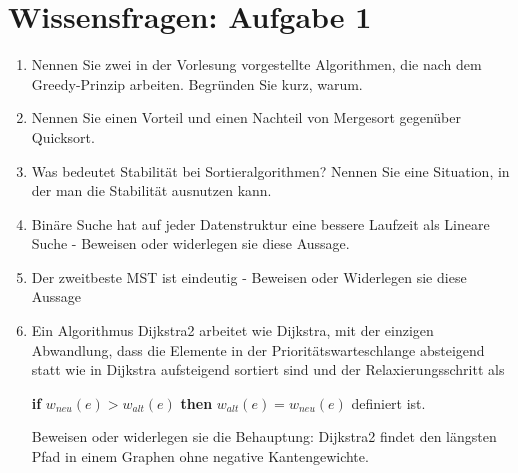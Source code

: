 \documentclass{scrartcl}
\begin{document}
\section*{Wissensfragen: Aufgabe 1}
\begin{enumerate}[(1)]

\item Nennen Sie zwei in der Vorlesung vorgestellte Algorithmen, die nach dem Greedy-Prinzip arbeiten. Begründen Sie kurz, warum.

\item Nennen Sie einen Vorteil und einen Nachteil von Mergesort gegenüber Quicksort.

\item Was bedeutet Stabilität bei Sortieralgorithmen? Nennen Sie eine Situation, in der man die Stabilität ausnutzen kann.

\item Bin\"are Suche hat auf jeder Datenstruktur eine bessere Laufzeit als Lineare Suche - Beweisen oder widerlegen sie diese Aussage.

\item Der zweitbeste MST ist eindeutig - Beweisen oder Widerlegen sie diese Aussage

\item Ein Algorithmus Dijkstra2 arbeitet wie Dijkstra, mit der einzigen Abwandlung, dass die Elemente in der Priorit\"atswarteschlange absteigend statt wie in Dijkstra aufsteigend sortiert sind und der Relaxierungsschritt als \newline

\textbf{if} $w_{neu}\left(e \right) > w_{alt} \left(e \right)$ \textbf{then} $w_{alt}\left( e \right) = w_{neu} \left( e \right) $ 
\newline
\newline
definiert ist.

Beweisen oder widerlegen sie die Behauptung:
Dijkstra2 findet den l\"angsten Pfad in einem Graphen ohne negative Kantengewichte. 

\end{enumerate}
\end{document}
